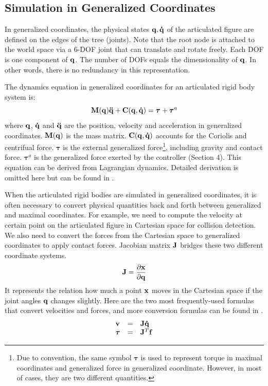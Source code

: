 \subsection{Simulation in Generalized Coordinates}
In generalized coordinates, the physical states $\mathbf{q}, \mathbf{\dot{q}}$ of the articulated figure are defined on the edges of the tree (joints). Note that the root node is attached to the world space via a 6-DOF joint that can translate and rotate freely. Each DOF is one component of $\mathbf{q}$. The number of DOFs equals the dimensionality of $\mathbf{q}$. In other words, there is no redundancy in this representation.

The dynamics equation in generalized coordinates for an articulated rigid body system is:
\begin{equation}
  \vc{M}(\vc{q})\vc{\ddot{q}}+\vc{C(q,\dot{q})}=\boldsymbol{\tau}+\boldsymbol{\tau}^a
  \label{eq:generalized}
\end{equation}
where $\mathbf{q}$, $\mathbf{\dot{q}}$ and $\mathbf{\ddot{q}}$ are the position, velocity and acceleration in generalized coordinates. $\mathbf{M(q)}$ is the mass matrix. $\mathbf{C(q,\dot{q})}$ accounts for the Coriolis and centrifual force. $\boldsymbol{\tau}$ is the external generalized force\footnote{Due to convention, the same symbol $\boldsymbol{\tau}$ is used to represent torque in maximal coordinates and generalized force in generalized coordinate. However, in most of cases, they are two different quantities.}, including gravity and contact force. $\boldsymbol{\tau}^a$ is the generalized force exerted by the controller (Section 4). This equation can be derived from Lagrangian dynamics. Detailed derivation is omitted here but can be found in \citet{Liu:2012:STM}.

When the articulated rigid bodies are simulated in generalized coordinates, it is often necessary to convert physical quantities back and forth between generalized and maximal coordinates. For example, we need to compute the velocity at certain point on the articulated figure in Cartesian space for collision detection. We also need to convert the forces from the Cartesian space to generalized coordinates to apply contact forces. Jacobian matrix $\mathbf{J}$  bridges these two different coordinate systems.  
\begin{equation}
\mathbf{J}=\frac{\partial \mathbf{x}}{\partial \mathbf{q}}
\end{equation}
It represents the relation how much a point $\mathbf{x}$ moves in the Cartesian space if the joint angles $\mathbf{q}$ changes slightly. Here are the two most frequently-used formulas that convert velocities and forces, and more conversion formulas can be found in \citet{Liu:2012:STM}. 
\begin{displaymath}
  \begin{array}{lll}
    \mathbf{v} & = & \mathbf{J}\mathbf{\dot{q}}\\
    \boldsymbol{\tau} & = &\mathbf{J}^T\mathbf{f}
   \end{array}
\end{displaymath}


